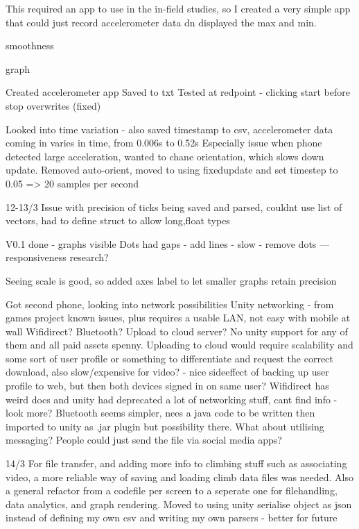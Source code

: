 This required an app to use in the in-field studies, so I created a very simple app that could just record accelerometer data dn displayed the max and min.


smoothness

graph







Created accelerometer app
Saved to txt
Tested at redpoint - clicking start before stop overwrites (fixed)

Looked into time variation - also saved timestamp to csv, accelerometer data coming in varies in time, from 0.006s to 0.52s 
Especially issue when phone detected large acceleration, wanted to chane orientation, which slows down update.
Removed auto-orient,  moved to using fixedupdate and set timestep to 0.05 => 20 samples per second

12-13/3
Issue with precision of ticks being saved and parsed, couldnt use list of vectors, had to define struct to allow long,float types

V0.1 done - graphs visible
Dots had gaps - add lines - slow - remove dots ---  responsiveness research?

Seeing scale is good, so added axes label to let smaller graphs retain precision


Got second phone, looking into network possibilities
Unity networking - from games project known issues, plus requires a usable LAN, not easy with mobile at wall
Wifidirect?
Bluetooth?
Upload to cloud server?
 No unity support for any of them and all paid assets spenny.
Uploading to cloud would require scalability and some sort of user profile or something to differentiate and request the correct download, also slow/expensive for video? - nice sideeffect of backing up user profile to web, but then both devices signed in on same user?
Wifidirect has weird docs and unity had deprecated a lot of networking stuff, cant find info - look more?
Bluetooth seems simpler, nees a java code to be written then imported to unity as .jar plugin but possibility there.
What about utilising messaging? People could just send the file via social media apps?



14/3
For file transfer, and adding more info to climbing stuff such as associating video, a more reliable way of saving and loading climb data files was needed.
Also a general refactor from a codefile per screen to a seperate one for filehandling, data analytics, and graph rendering.
Moved to using unity serialise object as json instead of defining my own csv and writing my own parsers - better for future

